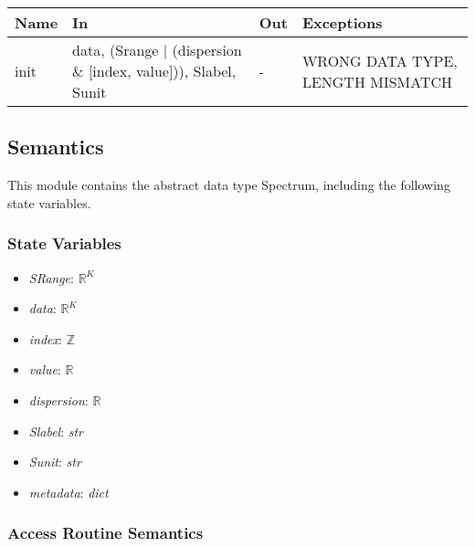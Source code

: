 \documentclass[12pt, titlepage]{article}
\begin{document}
\begin{center}
\begin{tabular}{p{1.5cm} p{4cm} p{4cm} p{4cm}}
\toprule
\textbf{Name} & \textbf{In} & \textbf{Out} & \textbf{Exceptions} \\
\midrule
init & data, (Srange $|$ (dispersion $\&$ [index, value])), Slabel, Sunit & - & WRONG DATA TYPE, LENGTH MISMATCH \\
\bottomrule
\end{tabular}
\end{center}

\subsection{Semantics}
This module contains the abstract data type Spectrum, including the following state variables.
\subsubsection{State Variables}
\begin{itemize}
\item \textit{SRange}: $\mathbb{R}^K$
\item \textit{data}: $\mathbb{R}^K$
\item \textit{index}: $\mathbb{Z}$
\item \textit{value}: $\mathbb{R}$
\item \textit{dispersion}: $\mathbb{R}$
\item \textit{Slabel}: \textit{str}
\item \textit{Sunit}: \textit{str}
\item \textit{metadata}: \textit{dict}
\end{itemize}

\subsubsection{Access Routine Semantics}
\end{document}
